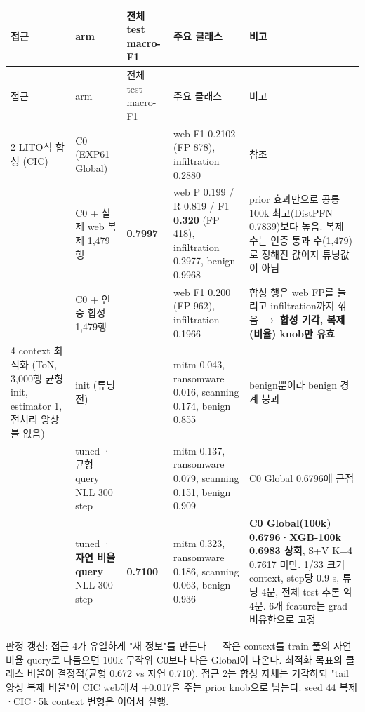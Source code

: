 \begingroup
\footnotesize
\begin{longtable}{>{\raggedright\arraybackslash}p{}>{\raggedright\arraybackslash}p{}>{\raggedleft\arraybackslash}p{}>{\raggedright\arraybackslash}p{}>{\raggedright\arraybackslash}p{}}
\toprule
접근 & arm & 전체 test macro-F1 & 주요 클래스 & 비고 \\ \midrule
\endfirsthead
접근 & arm & 전체 test macro-F1 & 주요 클래스 & 비고 \\ \midrule
\endhead
{}2 LITO식 합성 (CIC) & C0 (EXP61 Global) & 0.7824 & web F1 0.2102 (FP 878), infiltration 0.2880 & 참조 \\
{} & C0 +\allowbreak{} 실제 web 복제 1,479행 & \textbf{0.7997} & web P 0.199 /\allowbreak{} R 0.819 /\allowbreak{} F1 \textbf{0.320} (FP 418), infiltration 0.2977, benign 0.9968 & prior 효과만으로 공통 100k 최고(DistPFN 0.7839)보다 높음. 복제 수는 인증 통과 수(1,479)로 정해진 값이지 튜닝값이 아님 \\
{} & C0 +\allowbreak{} 인증 합성 1,479행 & 0.7680 & web F1 0.200 (FP 962), infiltration 0.1966 & 합성 행은 web FP를 늘리고 infiltration까지 깎음  \ensuremath{\rightarrow}  \textbf{합성 기각, 복제(비율) knob만 유효} \\
{}4 context 최적화 (ToN, 3,000행 균형 init, estimator 1, 전처리 앙상블 없음) & init (튜닝 전) & 0.6449 & mitm 0.043, ransomware 0.016, scanning 0.174, benign 0.855 & 300 benign뿐이라 benign 경계 붕괴 \\
{} & tuned · 균형 query NLL 300 step & 0.6720 & mitm 0.137, ransomware 0.079, scanning 0.151, benign 0.909 & C0 Global 0.6796에 근접 \\
{} & tuned · \textbf{자연 비율 query} NLL 300 step & \textbf{0.7100} & mitm 0.323, ransomware 0.186, scanning 0.063, benign 0.936 & \textbf{C0 Global(100k) 0.6796·XGB-100k 0.6983 상회}, S+\allowbreak{}V K=\allowbreak{}4 0.7617 미만. 1/\allowbreak{}33 크기 context, step당 0.9 s, 튜닝 4분, 전체 test 추론 약 4분. 6개 feature는 grad 비유한으로 고정 \\
\bottomrule
\end{longtable}
\endgroup
판정 갱신: 접근 4가 유일하게 "새 정보"를 만든다 — 작은 context를 train 풀의 자연 비율 query로 다듬으면 100k 무작위 C0보다 나은 Global이 나온다. 최적화 목표의 클래스 비율이 결정적(균형 0.672 vs 자연 0.710). 접근 2는 합성 자체는 기각하되 "tail 양성 복제 비율"이 CIC web에서 +\allowbreak{}0.017을 주는 prior knob으로 남는다. seed 44 복제·CIC·5k context 변형은 이어서 실행.

